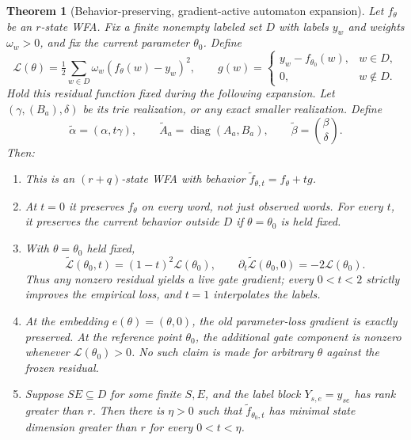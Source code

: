\documentclass[11pt]{article}
\newtheorem{theorem}{Theorem}[section]
\theoremstyle{definition}
\theoremstyle{remark}
\begin{document}
\begin{theorem}[Behavior-preserving, gradient-active automaton expansion]
\label{ce:residual-extension}
Let $f_\theta$ be an $r$-state WFA. Fix a finite nonempty labeled set
$D$ with labels $y_w$ and weights $\omega_w>0$, and fix the current
parameter $\theta_0$. Define
\[
 \mathcal L(\theta)=\tfrac12\sum_{w\in D}\omega_w
       (f_\theta(w)-y_w)^2,
 \qquad
 g(w)=\begin{cases}y_w-f_{\theta_0}(w),&w\in D,\\0,&w\notin D.
 \end{cases}
\]
Hold this residual function fixed during the following expansion. Let
$(\gamma,(B_a),\delta)$ be its trie realization, or any exact smaller
realization. Define
\[
 \widetilde\alpha=(\alpha,t\gamma),\qquad
 \widetilde A_a=\operatorname{diag}(A_a,B_a),\qquad
 \widetilde\beta=\binom\beta\delta.
\]
Then:
\begin{enumerate}
\item This is an $(r+q)$-state WFA with behavior
      $\widetilde f_{\theta,t}=f_\theta+tg$.
\item At $t=0$ it preserves $f_\theta$ on every word, not just observed
      words. For every $t$, it preserves the current behavior outside $D$
      if $\theta=\theta_0$ is held fixed.
\item With $\theta=\theta_0$ held fixed,
\[
 \widetilde{\mathcal L}(\theta_0,t)
 =(1-t)^2\mathcal L(\theta_0),\qquad
 \partial_t\widetilde{\mathcal L}(\theta_0,0)
 =-2\mathcal L(\theta_0).
\]
      Thus any nonzero residual yields a live gate gradient; every
      $0<t<2$ strictly improves the empirical loss, and $t=1$
      interpolates the labels.
\item At the embedding $e(\theta)=(\theta,0)$, the old parameter-loss
      gradient is exactly preserved. At the reference point $\theta_0$,
      the additional gate component is nonzero whenever
      $\mathcal L(\theta_0)>0$. No such claim is made for arbitrary
      $\theta$ against the frozen residual.
\item Suppose $SE\subseteq D$ for some finite $S,E$, and the label block
      $Y_{s,e}=y_{se}$ has rank greater than $r$. Then there is $\eta>0$
      such that $\widetilde f_{\theta_0,t}$ has minimal state dimension
      greater than $r$ for every $0<t<\eta$.
\end{enumerate}
\end{theorem}
\end{document}
